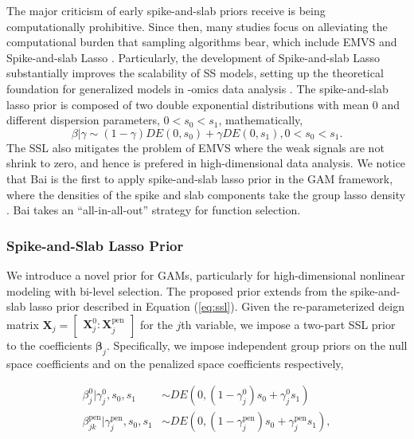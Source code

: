 \documentclass[AMA,STIX1COL,]{WileyNJD-v2}
\begin{document}
The major criticism of early spike-and-slab priors receive is being
computationally prohibitive. \citep{Bai2021Review} Since then, many
studies focus on alleviating the computational burden that sampling
algorithms bear, which include EMVS \citep{Rockova2014a} and
Spike-and-slab Lasso \citep{Rockova2018b, Rockova2018}. Particularly,
the development of Spike-and-slab Lasso substantially improves the
scalability of SS models, setting up the theoretical foundation for
generalized models in -omics data analysis
\citep{Tang2017a, Tang2017, Tang2018, Tang2019}. The spike-and-slab
lasso prior is composed of two double exponential distributions with
mean 0 and different dispersion parameters, \(0 < s_0 < s_1\),
mathematically, \begin{equation} \label{eq:ssl}
\beta | \gamma \sim (1-\gamma)DE(0, s_0) + \gamma DE(0, s_1), 0 < s_0 < s_1.
\end{equation} The SSL also mitigates the problem of EMVS where the weak
signals are not shrink to zero, and hence is prefered in
high-dimensional data analysis. We notice that Bai \citep{Bai2021} is
the first to apply spike-and-slab lasso prior in the GAM framework,
where the densities of the spike and slab components take the group
lasso density \citep{Xu2015}. Bai \citep{Bai2021} takes an
``all-in-all-out'' strategy for function selection.

\hypertarget{spike-and-slab-lasso-prior}{%
\subsubsection{Spike-and-Slab Lasso
Prior}\label{spike-and-slab-lasso-prior}}

We introduce a novel prior for GAMs, particularly for high-dimensional
nonlinear modeling with bi-level selection. The proposed prior extends
from the spike-and-slab lasso prior described in Equation
(\ref{eq:ssl}). Given the re-parameterized deign matrix
\(\boldsymbol{X}_j = \begin{bmatrix} \boldsymbol{X}_j^0 : \boldsymbol{X}_j^\text{pen}\end{bmatrix}\)
for the \(j\)th variable, we impose a two-part SSL prior to the
coefficients \(\boldsymbol{\beta}_j\). Specifically, we impose
independent group priors on the null space coefficients and on the
penalized space coefficients respectively,

\begin{align}\label{eq:bham_ssl}
  \beta^0_{j} |\gamma^0_{j},s_0,s_1 &\sim DE(0,(1-\gamma^0_{j}) s_0 + \gamma^0_{j} s_1) \nonumber \\
  \beta^\text{pen}_{jk} | \gamma^\text{pen}_{j},s_0,s_1 &\sim DE(0,(1-\gamma^\text{pen}_{j}) s_0 + \gamma^\text{pen}_{j} s_1), 
\end{align}
\end{document}
